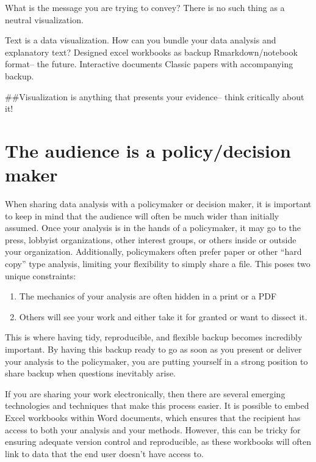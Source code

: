 \documentclass[]{book}
\providecommand{\tightlist}{%
  \setlength{\itemsep}{0pt}\setlength{\parskip}{0pt}}
\begin{document}
What is the message you are trying to convey? There is no such thing as a neutral visualization.

Text is a data visualization. How can you bundle your data analysis and explanatory text?
Designed excel workbooks as backup
Rmarkdown/notebook format-- the future.
Interactive documents
Classic papers with accompanying backup.

\#\#Visualization is anything that presents your evidence-- think critically about it!

\hypertarget{the-audience-is-a-policydecision-maker}{%
\section{The audience is a policy/decision maker}\label{the-audience-is-a-policydecision-maker}}

When sharing data analysis with a policymaker or decision maker, it is important to keep in mind that the audience will often be much wider than initially assumed. Once your analysis is in the hands of a policymaker, it may go to the press, lobbyist organizations, other interest groups, or others inside or outside your organization. Additionally, policymakers often prefer paper or other ``hard copy'' type analysis, limiting your flexibility to simply share a file. This poses two unique constraints:

\begin{enumerate}
\def\labelenumi{\arabic{enumi})}
\tightlist
\item
  The mechanics of your analysis are often hidden in a print or a PDF
\item
  Others will see your work and either take it for granted or want to dissect it.
\end{enumerate}

This is where having tidy, reproducible, and flexible backup becomes incredibly important. By having this backup ready to go as soon as you present or deliver your analysis to the policymaker, you are putting yourself in a strong position to share backup when questions inevitably arise.

If you are sharing your work electronically, then there are several emerging technologies and techniques that make this process easier. It is possible to embed Excel workbooks within Word documents, which ensures that the recipient has access to both your analysis and your methods. However, this can be tricky for ensuring adequate version control and reproducible, as these workbooks will often link to data that the end user doesn't have access to.
\end{document}
